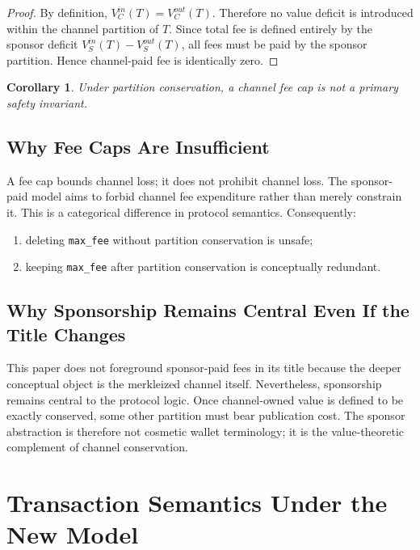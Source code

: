 \documentclass[11pt,a4paper]{article}
\newtheorem{corollary}[theorem]{Corollary}
\newcommand{\code}[1]{\texttt{#1}}
\begin{document}
\begin{proof}
By definition, $V_C^{in}(T) = V_C^{out}(T)$. Therefore no value deficit is introduced within the channel partition of $T$. Since total fee is defined entirely by the sponsor deficit $V_S^{in}(T) - V_S^{out}(T)$, all fees must be paid by the sponsor partition. Hence channel-paid fee is identically zero.
\end{proof}

\begin{corollary}
Under partition conservation, a channel fee cap is not a primary safety invariant.
\end{corollary}

\subsection{Why Fee Caps Are Insufficient}

A fee cap bounds channel loss; it does not prohibit channel loss. The sponsor-paid model aims to forbid channel fee expenditure rather than merely constrain it. This is a categorical difference in protocol semantics. Consequently:
\begin{enumerate}
    \item deleting \code{max\_fee} without partition conservation is unsafe;
    \item keeping \code{max\_fee} after partition conservation is conceptually redundant.
\end{enumerate}

\subsection{Why Sponsorship Remains Central Even If the Title Changes}

This paper does not foreground sponsor-paid fees in its title because the deeper conceptual object is the merkleized channel itself. Nevertheless, sponsorship remains central to the protocol logic. Once channel-owned value is defined to be exactly conserved, some other partition must bear publication cost. The sponsor abstraction is therefore not cosmetic wallet terminology; it is the value-theoretic complement of channel conservation.

\section{Transaction Semantics Under the New Model}
\end{document}
